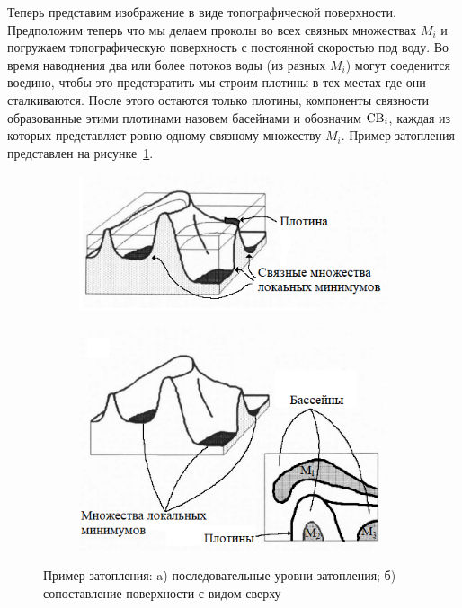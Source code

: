 \documentclass[14pt, a4paper]{extreport}
\begin{document}
	Теперь представим изображение в виде топографической поверхности. Предположим теперь что мы делаем проколы во всех связных множествах $M_i$ и погружаем топографическую поверхность с постоянной скоростью под воду. Во время наводнения два или более потоков воды (из разных $M_i$) могут соеденится воедино, чтобы это предотвратить мы строим плотины в тех местах где они сталкиваются. После этого остаются только плотины, компоненты связности образованные этими плотинами назовем басейнами и обозначим $\textup{CB}_i$, каждая из которых представляет ровно одному связному множеству $M_i$. Пример затопления представлен на рисунке~\ref{fig:potop_watershed}.
	\begin{figure}[h!]
		\begin{subfigure}{.49\textwidth}
			\centering
			\includegraphics[width = \textwidth]{image/chapter_3/potop1_watershed}
			\caption{}
		\end{subfigure}
		\begin{subfigure}{.49\textwidth}
			\centering
			\includegraphics[width = \textwidth]{image/chapter_3/potop2_watershed}
			\caption{}
		\end{subfigure}
		\centering
		\caption{Пример затопления: a) последовательные уровни затопления; б) сопоставление поверхности с видом сверху}
		\label{fig:potop_watershed}
	\end{figure}
\end{document}

